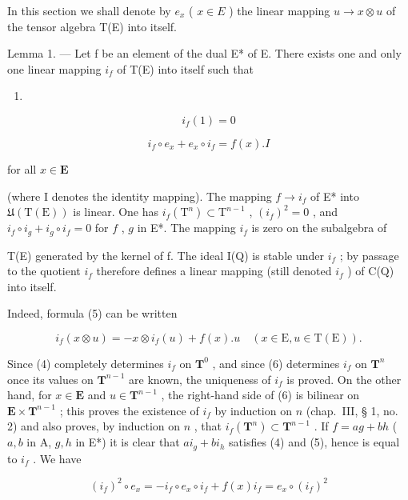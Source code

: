 In this section we shall denote by \(e_x\) ( \(x \in E\) ) the linear mapping \(u \to x \otimes u\) of the tensor algebra T(E) into itself.

Lemma 1. — Let f be an element of the dual E* of E. There exists one and only one linear mapping \(i_{f}\) of T(E) into itself such that

\begin{enumerate}
\def\labelenumi{(\arabic{enumi})}
\setcounter{enumi}{3}
\tightlist
\item
\end{enumerate}

\[
i _ {f} (1) = 0\tag{5}
\]

\[
i _ {f} \circ e _ {x} + e _ {x} \circ i _ {f} = f (x). I
\]

for all \(x \in \mathbf{E}\)

(where I denotes the identity mapping). The mapping \(f \to i_f\) of E* into \(\mathfrak{U}(\mathrm{T}(\mathrm{E}))\) is linear. One has \(i_f(\mathrm{T}^n) \subset \mathrm{T}^{n-1}\) , \((i_f)^2 = 0\) , and \(i_f \circ i_g + i_g \circ i_f = 0\) for \(f\) , \(g\) in E*. The mapping \(i_f\) is zero on the subalgebra of

T(E) generated by the kernel of f. The ideal I(Q) is stable under \(i_{f}\) ; by passage to the quotient \(i_{f}\) therefore defines a linear mapping (still denoted \(i_{f}\) ) of C(Q) into itself.

Indeed, formula (5) can be written

\[
i _ {f} (x \otimes u) = - x \otimes i _ {f} (u) + f (x). u \quad (x \in \mathrm{E}, u \in \mathrm{T(E)}).\tag{6}
\]

Since (4) completely determines \(i_{f}\) on \(\mathbf{T}^{0}\) , and since (6) determines \(i_{f}\) on \(\mathbf{T}^{n}\) once its values on \(\mathbf{T}^{n-1}\) are known, the uniqueness of \(i_{f}\) is proved. On the other hand, for \(x\in\mathbf{E}\) and \(u\in\mathbf{T}^{n-1}\) , the right-hand side of (6) is bilinear on \(\mathbf{E}\times\mathbf{T}^{n-1}\) ; this proves the existence of \(i_{f}\) by induction on \(n\) (chap.~III, § 1, no. 2) and also proves, by induction on \(n\) , that \(i_{f}(\mathbf{T}^{n})\subset\mathbf{T}^{n-1}\) . If \(f=ag+bh\) ( \(a,b\) in A, \(g,h\) in E*) it is clear that \(ai_{g}+bi_{h}\) satisfies (4) and (5), hence is equal to \(i_{f}\) . We have

\[
(i _ {f}) ^ {2} \circ e _ {x} = - i _ {f} \circ e _ {x} \circ i _ {f} + f (x) i _ {f} = e _ {x} \circ (i _ {f}) ^ {2}
\]

